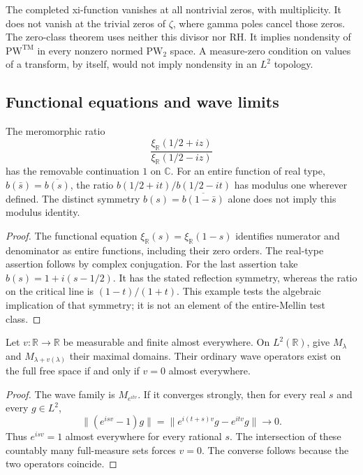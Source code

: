 \begin{remark}
\label{v4-arith:w7-j:rem:T2-restriction}
\label{v4-arith:w7-j:rem:TM-density}
The completed xi-function vanishes at all nontrivial zeros, with
multiplicity. It does not vanish at the trivial zeros of \(\zeta\),
where gamma poles cancel those zeros.
The zero-class theorem uses neither this divisor nor RH.
It implies nondensity of \(\mathrm{PW}^{\mathrm{TM}}\) in every
nonzero normed \(\mathrm{PW}_2\) space. A measure-zero condition
on values of a transform, by itself, would not imply nondensity
in an \(L^2\) topology.
\end{remark}

\subsection{Functional equations and wave limits}
\label{v4-arith:w7-j:classical-mellin}

\begin{proposition}
\label{v4-arith:w7-j:prop:TM-S-classical}
The meromorphic ratio
\begin{equation}
\label{v4-arith:w7-j:eq:S-TM}
 \frac{\xi_{\mathbb R}(1/2+iz)}{\xi_{\mathbb R}(1/2-iz)}
\end{equation}
has the removable continuation \(1\) on \(\mathbb C\).
For an entire function of real type, \(b(\bar s)=\overline{b(s)}\),
the ratio \(b(1/2+it)/b(1/2-it)\) has modulus one wherever defined.
The distinct symmetry \(b(s)=\overline{b(1-\bar s)}\) alone does
not imply this modulus identity.
\end{proposition}
\begin{proof}
The functional equation \(\xi_{\mathbb R}(s)=\xi_{\mathbb R}(1-s)\)
identifies numerator and denominator as entire functions, including
their zero orders. The real-type assertion follows by complex
conjugation. For the last assertion take
\(b(s)=1+i(s-1/2)\). It has the stated reflection symmetry, whereas
the ratio on the critical line is \((1-t)/(1+t)\).
This example tests the algebraic implication of that symmetry;
it is not an element of the entire-Mellin test class.
\end{proof}

\begin{proposition}
\label{v4-arith:w7-j:prop:multiplication-waves}
Let \(v:\mathbb R\to\mathbb R\) be measurable and finite almost
everywhere. On \(L^2(\mathbb R)\), give \(M_\lambda\) and
\(M_{\lambda+v(\lambda)}\) their maximal domains.
Their ordinary wave operators exist on the full free space if
and only if \(v=0\) almost everywhere.
\end{proposition}
\begin{proof}
The wave family is \(M_{e^{itv}}\).
If it converges strongly, then for every real \(s\) and every
\(g\in L^2\),
\[
 \|(e^{isv}-1)g\|
 =\|e^{i(t+s)v}g-e^{itv}g\|\longrightarrow0.
\]
Thus \(e^{isv}=1\) almost everywhere for every rational \(s\).
The intersection of these countably many full-measure sets forces
\(v=0\). The converse follows because the two operators coincide.
\end{proof}

